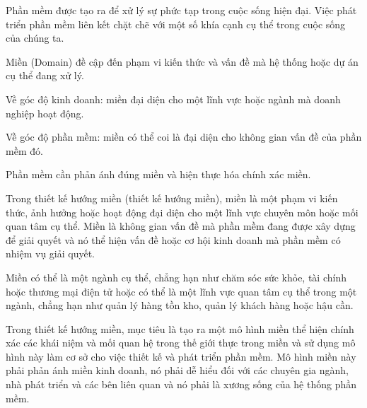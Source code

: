 Phần mềm được tạo ra để xử lý sự phức tạp trong cuộc sống hiện đại. Việc phát triển phần mềm liên kết chặt chẽ với một số khía cạnh cụ thể trong cuộc sống của chúng ta.

Miền (Domain) đề cập đến phạm vi kiến thức và vấn đề mà hệ thống hoặc dự án cụ thể đang xử lý.

Về góc độ kinh doanh: miền đại diện cho một lĩnh vực hoặc ngành mà doanh nghiệp hoạt động.

Về góc độ phần mềm: miền có thể coi là đại diện cho không gian vấn đề của phần mềm đó.

Phần mềm cần phản ánh đúng miền và hiện thực hóa chính xác miền.











Trong thiết kế hướng miền (thiết kế hướng miền), miền là một phạm vi kiến thức, ảnh hưởng hoặc hoạt động đại diện cho một lĩnh vực chuyên môn hoặc mối quan tâm cụ thể. Miền là không gian vấn đề mà phần mềm đang được xây dựng để giải quyết và nó thể hiện vấn đề hoặc cơ hội kinh doanh mà phần mềm có nhiệm vụ giải quyết.

Miền có thể là một ngành cụ thể, chẳng hạn như chăm sóc sức khỏe, tài chính hoặc thương mại điện tử hoặc có thể là một lĩnh vực quan tâm cụ thể trong một ngành, chẳng hạn như quản lý hàng tồn kho, quản lý khách hàng hoặc hậu cần.

Trong thiết kế hướng miền, mục tiêu là tạo ra một mô hình miền thể hiện chính xác các khái niệm và mối quan hệ trong thế giới thực trong miền và sử dụng mô hình này làm cơ sở cho việc thiết kế và phát triển phần mềm. Mô hình miền này phải phản ánh miền kinh doanh, nó phải dễ hiểu đối với các chuyên gia ngành, nhà phát triển và các bên liên quan và nó phải là xương sống của hệ thống phần mềm.

